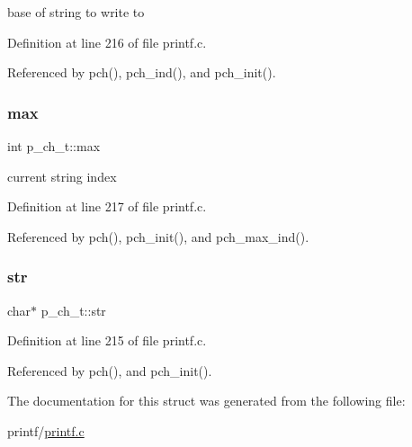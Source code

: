 base of string to write to 



Definition at line 216 of file printf.\+c.



Referenced by pch(), pch\+\_\+ind(), and pch\+\_\+init().

\mbox{\label{structp__ch__t_a0dee9f28e498d427e53051b7e1846d34}} 
\subsubsection{\texorpdfstring{max}{max}}
{\footnotesize\ttfamily int p\+\_\+ch\+\_\+t\+::max}



current string index 



Definition at line 217 of file printf.\+c.



Referenced by pch(), pch\+\_\+init(), and pch\+\_\+max\+\_\+ind().

\mbox{\label{structp__ch__t_aa3c8616342a2717bc714bf1b6d00516f}} 
\subsubsection{\texorpdfstring{str}{str}}
{\footnotesize\ttfamily char$\ast$ p\+\_\+ch\+\_\+t\+::str}



Definition at line 215 of file printf.\+c.



Referenced by pch(), and pch\+\_\+init().



The documentation for this struct was generated from the following file\+:\begin{DoxyCompactItemize}
\item 
printf/\hyperlink{printf_8c}{printf.\+c}\end{DoxyCompactItemize}
